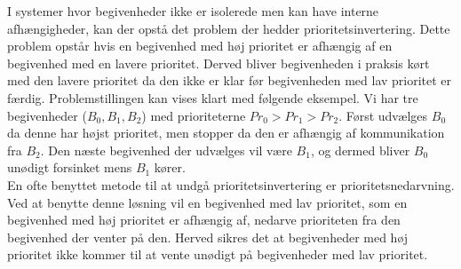 I systemer hvor begivenheder ikke er isolerede men kan have interne afhængigheder, kan der opstå det problem der hedder prioritetsinvertering\cite{sha1990priority}. Dette problem opstår hvis en begivenhed med høj prioritet er afhængig af en begivenhed med en lavere prioritet. Derved bliver begivenheden i praksis kørt med den lavere prioritet da den ikke er klar før begivenheden med lav prioritet er færdig. Problemstillingen kan vises klart med følgende eksempel. Vi har tre begivenheder ($B_0,B_1,B_2$) med prioriteterne $Pr_0>Pr_1>Pr_2$. Først udvælges $B_0$ da denne har højst prioritet, men stopper da den er afhængig af kommunikation fra $B_2$. Den næste begivenhed der udvælges vil være $B_1$, og dermed bliver $B_0$ unødigt forsinket mens $B_1$ kører.\\
En ofte benyttet metode til at undgå prioritetsinvertering er prioritetsnedarvning. Ved at benytte denne løsning vil en begivenhed med lav prioritet, som en begivenhed med høj prioritet er afhængig af, nedarve prioriteten fra den begivenhed der venter på den. Herved sikres det at begivenheder med høj prioritet ikke kommer til at vente unødigt på begivenheder med lav prioritet. 





